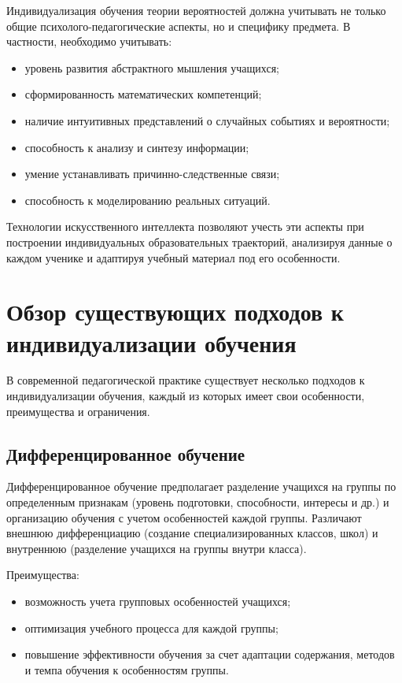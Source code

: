 \documentclass[a4paper,14pt]{extreport}
\begin{document}
Индивидуализация обучения теории вероятностей должна учитывать не только общие психолого-педагогические аспекты, но и специфику предмета. В частности, необходимо учитывать:

\begin{itemize}
    \item уровень развития абстрактного мышления учащихся;
    \item сформированность математических компетенций;
    \item наличие интуитивных представлений о случайных событиях и вероятности;
    \item способность к анализу и синтезу информации;
    \item умение устанавливать причинно-следственные связи;
    \item способность к моделированию реальных ситуаций.
\end{itemize}

Технологии искусственного интеллекта позволяют учесть эти аспекты при построении индивидуальных образовательных траекторий, анализируя данные о каждом ученике и адаптируя учебный материал под его особенности.

\section{Обзор существующих подходов к индивидуализации обучения}

В современной педагогической практике существует несколько подходов к индивидуализации обучения, каждый из которых имеет свои особенности, преимущества и ограничения.

\subsection{Дифференцированное обучение}

Дифференцированное обучение предполагает разделение учащихся на группы по определенным признакам (уровень подготовки, способности, интересы и др.) и организацию обучения с учетом особенностей каждой группы. Различают внешнюю дифференциацию (создание специализированных классов, школ) и внутреннюю (разделение учащихся на группы внутри класса).

Преимущества:
\begin{itemize}
    \item возможность учета групповых особенностей учащихся;
    \item оптимизация учебного процесса для каждой группы;
    \item повышение эффективности обучения за счет адаптации содержания, методов и темпа обучения к особенностям группы.
\end{itemize}
\end{document}

